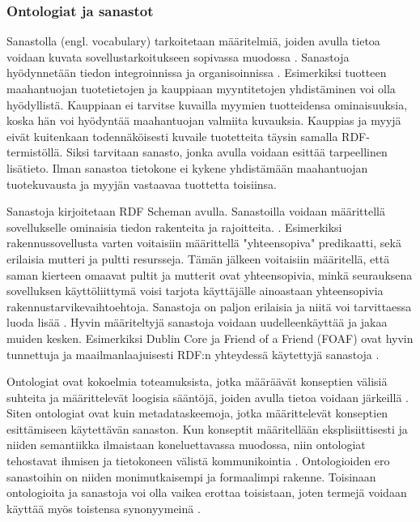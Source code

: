 \documentclass[finnish, 12pt, a4paper, elec, utf8, pdfa, online]{aaltothesis}
\begin{document}
\subsubsection{Ontologiat ja sanastot}
Sanastolla (engl. vocabulary) tarkoitetaan määritelmiä, joiden avulla tietoa voidaan kuvata sovellustarkoitukseen sopivassa muodossa \cite{RDF_specification}. Sanastoja hyödynnetään tiedon integroinnissa ja organisoinnissa \cite{vocabulary}. Esimerkiksi tuotteen maahantuojan tuotetietojen ja kauppiaan myyntitetojen yhdistäminen voi olla hyödyllistä. Kauppiaan ei tarvitse kuvailla myymien tuotteidensa ominaisuuksia, koska hän voi hyödyntää maahantuojan valmiita kuvauksia. Kauppias ja myyjä eivät kuitenkaan todennäköisesti kuvaile tuotetteita täysin samalla RDF-termistöllä. Siksi tarvitaan sanasto, jonka avulla voidaan esittää tarpeellinen lisätieto. Ilman sanastoa tietokone ei kykene yhdistämään maahantuojan tuotekuvausta ja myyjän vastaavaa tuottetta toisiinsa.

Sanastoja kirjoitetaan RDF Scheman avulla. Sanastoilla voidaan määrittellä sovellukselle ominaisia tiedon rakenteita ja rajoitteita. \cite{vocabulary}. Esimerkiksi rakennussovellusta varten voitaisiin määrittellä "yhteensopiva" predikaatti, sekä erilaisia mutteri ja pultti resursseja. Tämän jälkeen voitaisiin määritellä, että saman kierteen omaavat pultit ja mutterit ovat yhteensopivia, minkä seurauksena sovelluksen käyttöliittymä voisi tarjota käyttäjälle ainoastaan yhteensopivia rakennustarvikevaihtoehtoja. Sanastoja on paljon erilaisia ja niitä voi tarvittaessa luoda lisää \cite{RDF_specification}. Hyvin määriteltyjä sanastoja voidaan uudelleenkäyttää ja jakaa muiden kesken. Esimerkiksi Dublin Core ja Friend of a Friend (FOAF) ovat hyvin tunnettuja ja maailmanlaajuisesti RDF:n yhteydessä käytettyjä sanastoja \cite{data_namespace}.

Ontologiat ovat kokoelmia toteamuksista, jotka määräävät konseptien välisiä suhteita ja määrittelevät loogisia sääntöjä, joiden avulla tietoa voidaan järkeillä \cite{Berners_visio}.
Siten ontologiat ovat kuin metadataskeemoja, jotka määrittelevät konseptien esittämiseen käytettävän sanaston. Kun konseptit määritellään eksplisiittisesti ja niiden semantiikka ilmaistaan koneluettavassa muodossa, niin ontologiat tehostavat ihmisen ja tietokoneen välistä kommunikointia \cite{ontology_learning}. Ontologioiden ero sanastoihin on niiden monimutkaisempi ja formaalimpi rakenne. Toisinaan ontologioita ja sanastoja voi olla vaikea erottaa toisistaan, joten termejä voidaan käyttää myös toistensa synonyymeinä \cite{vocabulary}.
\end{document}
